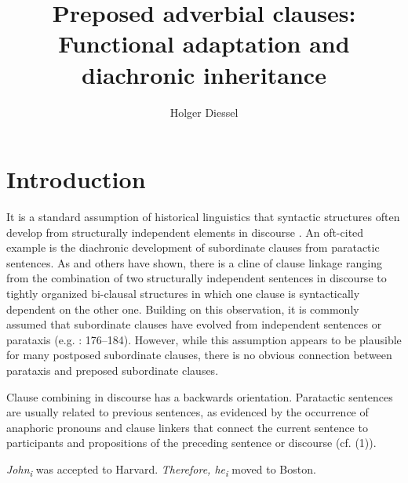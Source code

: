 \documentclass[output=paper]{langsci/langscibook}
\author{Holger Diessel\affiliation{University of Jena}}
\title{Preposed adverbial clauses: Functional adaptation and diachronic inheritance}
\begin{document}
\maketitle 

 

\section{Introduction}

It is a standard assumption of historical linguistics that syntactic structures often develop from structurally independent elements in discourse \citep{Givón1979}. An oft-cited example is the diachronic development of subordinate clauses from paratactic sentences. As \citet{Lehmann1988} and others have shown, there is a cline of clause linkage ranging from the combination of two structurally independent sentences in discourse to tightly organized bi-clausal structures in which one clause is syntactically dependent on the other one. Building on this observation, it is commonly assumed that subordinate clauses have evolved from independent sentences or parataxis (e.g. \citealt{HopperTraugott2003}: 176--184). However, while this assumption appears to be plausible for many postposed subordinate clauses, there is no obvious connection between parataxis and preposed subordinate clauses.

Clause combining in discourse has a backwards orientation. Paratactic sentences are usually related to previous sentences, as evidenced by the occurrence of anaphoric pronouns and clause linkers that connect the current sentence to participants and propositions of the preceding sentence or discourse (cf. (1)).
 

\ea\label{ex:key:}

\textit{John\textsubscript{i}} was accepted to Harvard. \textit{Therefore, he\textsubscript{i}} moved to Boston.\\ 

\z
\end{document}

